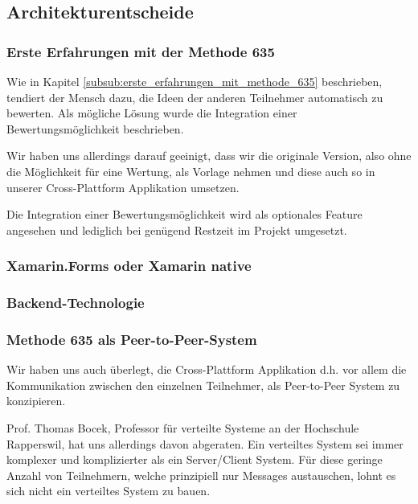 \subsection{Architekturentscheide}

\subsubsection{Erste Erfahrungen mit der Methode 635}
Wie in Kapitel \ref{subsub:erste_erfahrungen_mit_methode_635} beschrieben, tendiert der Mensch dazu, die Ideen der anderen Teilnehmer automatisch zu bewerten. Als mögliche Lösung wurde die Integration einer Bewertungsmöglichkeit beschrieben.


Wir haben uns allerdings darauf geeinigt, dass wir die originale Version, also ohne die Möglichkeit für eine Wertung, als Vorlage nehmen und diese auch so in unserer Cross-Plattform Applikation umsetzen. 


Die Integration einer Bewertungsmöglichkeit wird als optionales Feature angesehen und lediglich bei genügend Restzeit im Projekt umgesetzt.

\subsubsection{Xamarin.Forms oder Xamarin native}

\subsubsection{Backend-Technologie}

\subsubsection{Methode 635 als Peer-to-Peer-System}
Wir haben uns auch überlegt, die Cross-Plattform Applikation d.h. vor allem die Kommunikation zwischen den einzelnen Teilnehmer, als Peer-to-Peer System \cite{Peer2Peer} zu konzipieren.


Prof. Thomas Bocek, Professor für verteilte Systeme an der Hochschule Rapperswil, hat uns allerdings davon abgeraten. Ein verteiltes System sei immer komplexer und komplizierter als ein Server/Client System. Für diese geringe Anzahl von Teilnehmern, welche prinzipiell nur Messages austauschen, lohnt es sich nicht ein verteiltes System zu bauen. 


